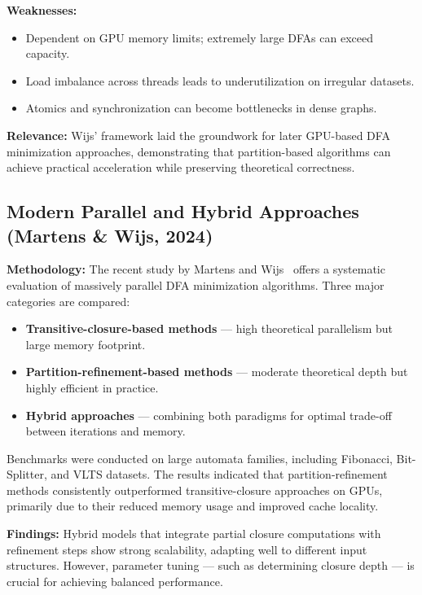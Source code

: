\textbf{Weaknesses:}
\begin{itemize}
    \item Dependent on GPU memory limits; extremely large DFAs can exceed capacity.
    \item Load imbalance across threads leads to underutilization on irregular datasets.
    \item Atomics and synchronization can become bottlenecks in dense graphs.
\end{itemize}

\textbf{Relevance:}
Wijs’ framework laid the groundwork for later GPU-based DFA minimization approaches, demonstrating that partition-based algorithms can achieve practical acceleration while preserving theoretical correctness.

\subsection{Modern Parallel and Hybrid Approaches (Martens \& Wijs, 2024)}

\textbf{Methodology:}
The recent study by Martens and Wijs~\cite{martenswijs2024} offers a systematic evaluation of massively parallel DFA minimization algorithms. Three major categories are compared:

\begin{itemize}
    \item \textbf{Transitive-closure-based methods} — high theoretical parallelism but large memory footprint.
    \item \textbf{Partition-refinement-based methods} — moderate theoretical depth but highly efficient in practice.
    \item \textbf{Hybrid approaches} — combining both paradigms for optimal trade-off between iterations and memory.
\end{itemize}

Benchmarks were conducted on large automata families, including Fibonacci, Bit-Splitter, and VLTS datasets. The results indicated that partition-refinement methods consistently outperformed transitive-closure approaches on GPUs, primarily due to their reduced memory usage and improved cache locality.

\textbf{Findings:}
Hybrid models that integrate partial closure computations with refinement steps show strong scalability, adapting well to different input structures. However, parameter tuning — such as determining closure depth — is crucial for achieving balanced performance.


